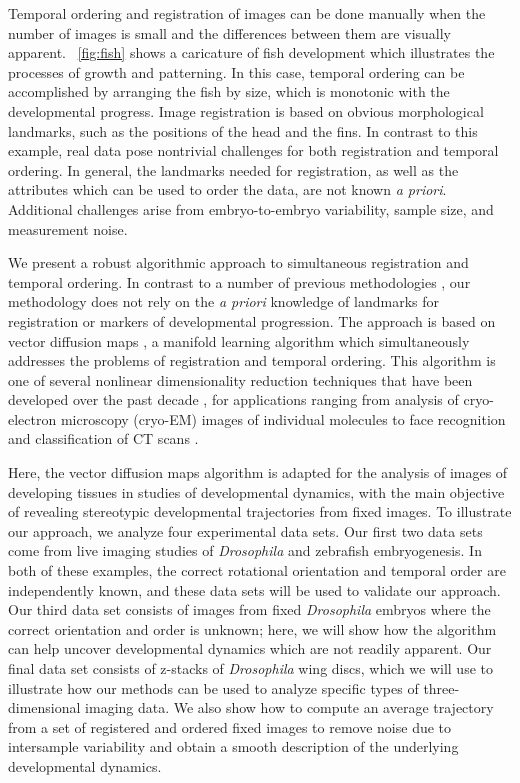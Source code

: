 Temporal ordering and registration of images can be done manually
when the number of images is small and the differences between them are visually apparent.
%
\fig~\ref{fig:fish} shows a caricature of fish development which illustrates the processes of growth and patterning.
%
In this case, temporal ordering can be accomplished by arranging the fish by size, which is monotonic with the developmental progress.
%
Image registration is based on obvious morphological landmarks, such as the positions of the head and the fins.
%
In contrast to this example, real data pose nontrivial challenges for both registration and temporal ordering.
%
In general, the landmarks needed for registration, as well as the attributes which can be used to order the data, are not known {\it a priori}.
%
Additional challenges arise from embryo-to-embryo variability, sample size, and measurement noise.

We present a robust algorithmic approach to simultaneous registration and temporal ordering.
%
In contrast to a number of previous methodologies \citep{zitova2003image, rowley1998rotation, hajnal2010medical, greenspan1994rotation, zhao2003face, dubuis2013accurate}, our methodology does not rely on the {\em a priori} knowledge of landmarks for registration or markers of developmental progression.
%
The approach is based on vector diffusion maps \citep{singer2012vector}, a manifold learning algorithm which simultaneously addresses the problems of registration and temporal ordering.
%
This algorithm is one of several nonlinear dimensionality reduction techniques that have been developed over the past decade \citep{Belkin2003, coifman2005geometric, coifman2006geometric, tenenbaum2000global, roweis2000nonlinear}, for
applications ranging from analysis of cryo-electron microscopy (cryo-EM) images of individual molecules  \citep{zhao2014rotationally, singer2011viewing} to face recognition \citep{lafon2006data} and classification of CT scans \citep{fernandez2014diffusion}.

Here, the vector diffusion maps algorithm is adapted for the analysis of images of developing tissues in studies of developmental dynamics, with the main objective of revealing stereotypic developmental trajectories from fixed images.
%
To illustrate our approach, we analyze four experimental data sets.
%
Our first two data sets come from live imaging studies of {\em Drosophila} and zebrafish embryogenesis.
%
In both of these examples, the correct rotational orientation and temporal order are independently known, and these data sets will be used to validate our approach.
%
Our third data set consists of images from fixed {\em Drosophila} embryos where the correct orientation and order is unknown; here, we will show how the algorithm can help uncover developmental dynamics which are not readily apparent.
%
Our final data set consists of z-stacks of {\em Drosophila} wing discs, which we will use to illustrate how our methods can be used to analyze specific types of three-dimensional imaging data.
%
We also show how to compute an average trajectory from a set of registered and ordered fixed images to remove noise due to intersample variability and obtain a smooth description of the underlying developmental dynamics.

